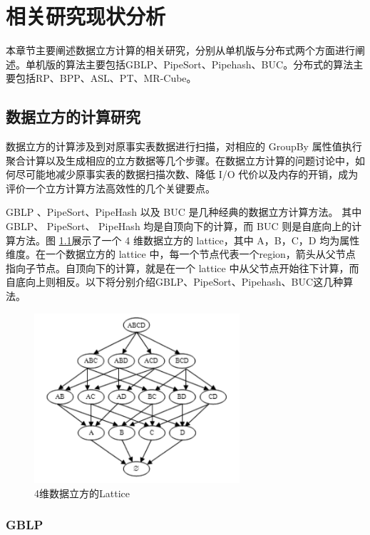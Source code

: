 \chapter{相关研究现状分析}

本章节主要阐述数据立方计算的相关研究，分别从单机版与分布式两个方面进行阐述。单机版的算法主要包括GBLP、PipeSort、Pipehash、BUC。分布式的算法主要包括RP、BPP、ASL、PT、MR-Cube。

\section{数据立方的计算研究}

数据立方的计算涉及到对原事实表数据进行扫描，对相应的 GroupBy 属性值执行聚合计算以及生成相应的立方数据等几个步骤。在数据立方计算的问题讨论中，如何尽可能地减少原事实表的数据扫描次数、降低 I/O 代价以及内存的开销，成为评价一个立方计算方法高效性的几个关键要点。

GBLP \cite{gray1997data}、PipeSort、PipeHash \cite{agarwal1996computation} 以及 BUC \cite{beyer1999bottom} 是几种经典的数据立方计算方法。 其中GBLP、 PipeSort、 PipeHash 均是自顶向下的计算，而 BUC 则是自底向上的计算方法。图 \ref{4_dimension_lattice}展示了一个 4 维数据立方的 lattice，其中 A，B，C，D 均为属性维度。在一个数据立方的 lattice 中，每一个节点代表一个region，箭头从父节点指向子节点。自顶向下的计算，就是在一个 lattice 中从父节点开始往下计算，而自底向上则相反。以下将分别介绍GBLP、PipeSort、Pipehash、BUC这几种算法。


\begin{figure}[!htb]
\centering\includegraphics[width=3in]{picture/ch_current_research/4_dimension_lattice} 
\caption{4维数据立方的Lattice}\label{4_dimension_lattice} 
\end{figure} 

\subsection{GBLP}

